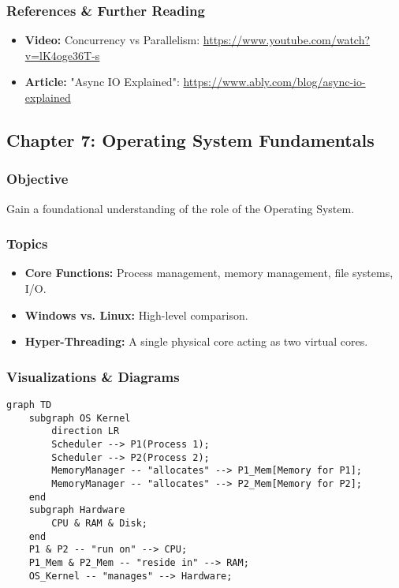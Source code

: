 \documentclass{article}
\begin{document}
\subsubsection{References \& Further Reading}
\begin{itemize}
    \item \textbf{Video:} Concurrency vs Parallelism: \url{https://www.youtube.com/watch?v=lK4oge36T-s}
    \item \textbf{Article:} "Async IO Explained": \url{https://www.ably.com/blog/async-io-explained}
\end{itemize}

\subsection{Chapter 7: Operating System Fundamentals}
\subsubsection{Objective}
Gain a foundational understanding of the role of the Operating System.

\subsubsection{Topics}
\begin{itemize}
    \item \textbf{Core Functions:} Process management, memory management, file systems, I/O.
    \item \textbf{Windows vs. Linux:} High-level comparison.
    \item \textbf{Hyper-Threading:} A single physical core acting as two virtual cores.
\end{itemize}

\subsubsection{Visualizations \& Diagrams}
\begin{verbatim}
graph TD
    subgraph OS Kernel
        direction LR
        Scheduler --> P1(Process 1);
        Scheduler --> P2(Process 2);
        MemoryManager -- "allocates" --> P1_Mem[Memory for P1];
        MemoryManager -- "allocates" --> P2_Mem[Memory for P2];
    end
    subgraph Hardware
        CPU & RAM & Disk;
    end
    P1 & P2 -- "run on" --> CPU;
    P1_Mem & P2_Mem -- "reside in" --> RAM;
    OS_Kernel -- "manages" --> Hardware;
\end{verbatim}
\end{document}
